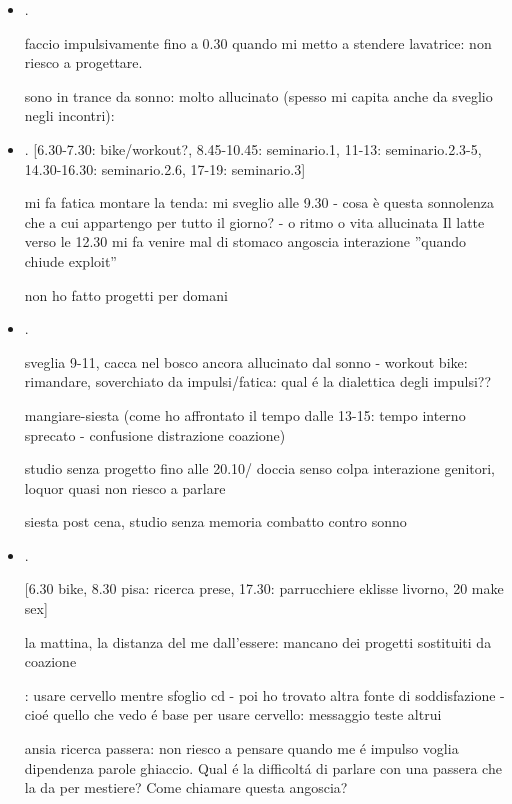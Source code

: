 \begin{itemize}
\item {}.

faccio impulsivamente fino a 0.30 quando mi metto a stendere lavatrice: non riesco a progettare.

sono in trance da sonno: molto allucinato (spesso mi capita anche da sveglio negli incontri): 

\item {}.
[6.30-7.30: bike/workout?, 8.45-10.45: seminario.1, 11-13: seminario.2.3-5, 14.30-16.30: seminario.2.6, 17-19: seminario.3]

mi fa fatica montare la tenda: mi sveglio alle 9.30 - cosa è questa sonnolenza che a cui appartengo per tutto il giorno? - o ritmo o vita allucinata
Il latte verso le 12.30 mi fa venire mal di stomaco
angoscia interazione ''quando chiude exploit''

non ho fatto progetti per domani

\item {}.

sveglia 9-11, cacca nel bosco ancora allucinato dal sonno - workout bike: rimandare, soverchiato da impulsi/fatica: qual \'e la dialettica degli impulsi??

mangiare-siesta (come ho affrontato il tempo dalle 13-15: tempo interno sprecato - confusione distrazione coazione)

studio senza progetto fino alle 20.10/ doccia senso colpa interazione genitori, loquor quasi non riesco a parlare

siesta post cena, studio senza memoria combatto contro sonno

\item {}.

[6.30 bike, 8.30 pisa: ricerca prese, 17.30: parrucchiere eklisse livorno, 20 make sex]

la mattina, la distanza del me dall'essere: mancano dei progetti sostituiti da coazione

: usare cervello mentre sfoglio cd - poi ho trovato altra fonte di soddisfazione - cio\'e quello che vedo \'e base per usare cervello: messaggio teste altrui

ansia ricerca passera: non riesco a pensare quando me \'e impulso voglia dipendenza parole ghiaccio. Qual \'e la difficolt\'a di parlare con una passera che la da per mestiere? Come chiamare questa angoscia?


\end{itemize}
